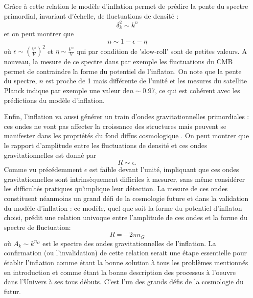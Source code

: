 Grâce à cette relation le modèle d'inflation permet de prédire la pente du spectre primordial, invariant d'échelle, de fluctuations de densité :
\begin{equation}
\delta^2_k\sim k^n
\end{equation}
et on peut montrer que 
\begin{equation}
n\sim 1-\epsilon -\eta
\end{equation}
où $\epsilon\sim (\frac{V'}{V})^2$ et $\eta \sim \frac{V''}{V}$ qui par condition de 'slow-roll' sont de petites valeurs. A nouveau, la mesure de ce spectre dans par exemple les fluctuations du CMB permet de contraindre la forme du potentiel de l'inflaton. On note que la pente du spectre, $n$ est proche de 1 mais différente de l'unité et les mesures du satellite Planck indique par exemple une valeur de$n\sim 0.97$, ce qui est cohérent avec les prédictions du modèle d'inflation.

Enfin, l'inflation va aussi générer un train d'ondes gravitationnelles primordiales : ces ondes ne vont pas affecter la croissance des structures mais peuvent se manifester dans les propriétés du fond diffus cosmologique .
On peut montrer que le rapport d'amplitude entre les fluctuations de densité et ces ondes gravitationnelles est donné par
\begin{equation}
R\sim \epsilon.
\end{equation}
Comme vu précédemment $\epsilon$ est faible devant l'unité, impliquant que ces ondes gravitationnelles sont intrinsèquement difficiles à mesurer, sans même considérer les difficultés pratiques qu'implique leur détection. La mesure de ces ondes constituent néanmoins un grand défi de la cosmologie future et dans la validation du modèle d'inflation : ce modèle, quel que soit la forme du potentiel d'inflaton choisi, prédit une relation univoque entre l'amplitude de ces ondes et la forme du spectre de fluctuation:
\begin{equation}
R=-2\pi n_G
\end{equation}
où $A_k\sim k^{n_G}$ est le spectre des ondes gravitationnelles de l'inflation. La confirmation (ou l'invalidation) de cette relation serait une étape essentielle pour établir l'inflation comme étant la bonne solution à tous les problèmes mentionnés en introduction et comme étant la bonne description des processus à l'oeuvre dans l'Univers à ses tous débuts. C'est l'un des grands défis de la cosmologie du futur.